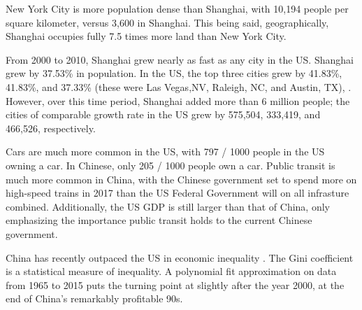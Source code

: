 \documentclass[12pt]{article}
\begin{document}
New York City is more population dense than Shanghai, with 10,194
people per square kilometer, versus 3,600 in Shanghai. This being
said, geographically, Shanghai occupies fully 7.5 times more land than
New York City.

From 2000 to 2010, Shanghai grew nearly as fast as any city in the
US. Shanghai grew by 37.53\% in population. In the US, the top three
cities grew by 41.83\%, 41.83\%, and 37.33\% (these were Las Vegas,NV,
Raleigh, NC, and Austin, TX)\cite{us-census:2011},
\cite{us-census:2001}. However, over this time period, Shanghai added
more than 6 million people; the cities of comparable growth rate in
the US grew by 575,504, 333,419, and 466,526, respectively.

Cars are much more common in the US, with 797 / 1000 people in the US
owning a car. In Chinese, only 205 / 1000 people own a car. Public
transit is much more common in China, with the Chinese government set
to spend more on high-speed trains in 2017 than the US Federal
Government will on all infrasture combined. Additionally, the US GDP
is still larger than that of China, only emphasizing the importance
public transit holds to the current Chinese government.

China has recently outpaced the US in economic inequality
\cite{Xie13052014}. The Gini coefficient is a statistical measure of
inequality. A polynomial fit approximation on data from 1965 to 2015
puts the turning point at slightly after the year 2000, at the end of
China's remarkably profitable 90s.

\nocite{*}


\end{document}
